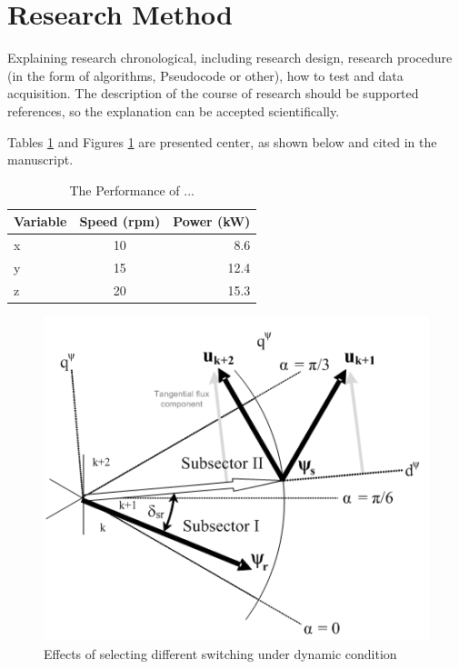 \section{Research Method}
\label{ResearchMethod}
Explaining research chronological, including research design, research procedure (in the form of algorithms, Pseudocode or other), how to test and data acquisition. The description of the course of research should be supported references, so the explanation can be accepted scientifically.
\par
Tables \ref{contohtabel} and Figures \ref{contohgambar} are presented center, as shown below and cited in the manuscript.\\

\begin{table}[ht]
\caption{The Performance of ...}
\centering
\begin{tabular}{lcr}
\hline
Variable & Speed (rpm) & Power (kW) \\
\hline
x & 10 & 8.6 \\
y & 15 & 12.4 \\
z & 20 & 15.3 \\
\hline
\end{tabular}
\label{contohtabel}
\end{table}

\begin{figure}[ht]
\centering
\includegraphics[scale=0.5]{figures/figure1}
\caption{Effects of selecting different switching under dynamic condition}
\label{contohgambar}
\end{figure}